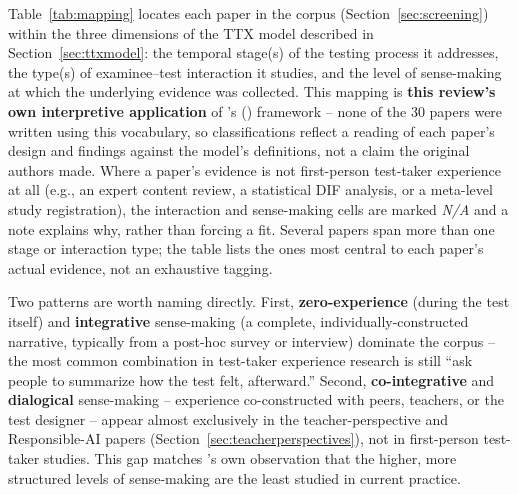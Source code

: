 \documentclass[11pt]{article}
\begin{document}
Table~\ref{tab:mapping} locates each paper in the corpus (Section~\ref{sec:screening}) within the three dimensions of the TTX model described in Section~\ref{sec:ttxmodel}: the temporal stage(s) of the testing process it addresses, the type(s) of examinee--test interaction it studies, and the level of sense-making at which the underlying evidence was collected. This mapping is \textbf{this review's own interpretive application} of \citeauthor{araneda2025ttxmodel}'s (\citeyear{araneda2025ttxmodel}) framework -- none of the 30 papers were written using this vocabulary, so classifications reflect a reading of each paper's design and findings against the model's definitions, not a claim the original authors made. Where a paper's evidence is not first-person test-taker experience at all (e.g., an expert content review, a statistical DIF analysis, or a meta-level study registration), the interaction and sense-making cells are marked \emph{N/A} and a note explains why, rather than forcing a fit. Several papers span more than one stage or interaction type; the table lists the ones most central to each paper's actual evidence, not an exhaustive tagging.

Two patterns are worth naming directly. First, \textbf{zero-experience} (during the test itself) and \textbf{integrative} sense-making (a complete, individually-constructed narrative, typically from a post-hoc survey or interview) dominate the corpus -- the most common combination in test-taker experience research is still ``ask people to summarize how the test felt, afterward.'' Second, \textbf{co-integrative} and \textbf{dialogical} sense-making -- experience co-constructed with peers, teachers, or the test designer -- appear almost exclusively in the teacher-perspective and Responsible-AI papers (Section~\ref{sec:teacherperspectives}), not in first-person test-taker studies. This gap matches \citeauthor{araneda2025ttxmodel}'s own observation that the higher, more structured levels of sense-making are the least studied in current practice.
\end{document}
